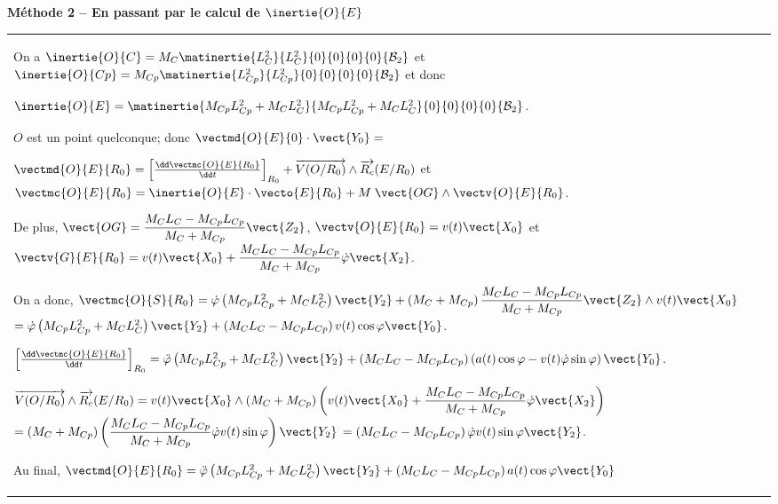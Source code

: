 \begin{multicols}{2}
\begin{corrige}
\textbf{Méthode 2 -- En passant par le calcul de $\inertie{O}{E}$}

 \begin{tabular}{|p{.9\linewidth}}
On a $\inertie{O}{C}=M_C\matinertie{L_C^2}{L_C^2}{0}{0}{0}{0}{\mathcal{B}_2}$ et $\inertie{O}{Cp}=M_{Cp}\matinertie{L_{Cp}^2}{L_{Cp}^2}{0}{0}{0}{0}{\mathcal{B}_2}$ et donc 

$\inertie{O}{E}=\matinertie{M_{Cp}L_{Cp}^2+M_{C}L_{C}^2}{M_{Cp}L_{Cp}^2+M_{C}L_{C}^2}{0}{0}{0}{0}{\mathcal{B}_2}$.

$O$ est un point quelconque; donc $\vectmd{O}{E}{0}\cdot \vect{Y_0} =$

$\vectmd{O}{E}{R_0}=\left[\frac{\dd \vectmc{O}{E}{R_0}}{\dd t}\right]_{R_0}+\overrightarrow{V(O/R_0)}\wedge \overrightarrow{R_c}(E/R_0)$ et 
$\vectmc{O}{E}{R_0}=\inertie{O}{E}\cdot \vecto{E}{R_0}+M\;\vect{OG}\wedge \vectv{O}{E}{R_0}$. 

De plus, 
$\vect{OG}=\dfrac{M_CL_C-M_{Cp}L_{Cp}}{M_C+M_{Cp}}\vect{Z_2}$, $\vectv{O}{E}{R_0}=v(t)\vect{X_0}$ et
$\vectv{G}{E}{R_0}=v(t)\vect{X_0}+\dfrac{M_CL_C-M_{Cp}L_{Cp}}{M_C+M_{Cp}}\dot{\varphi}\vect{X_2}$.


On a donc, 
$\vectmc{O}{S}{R_0}=\dot{\varphi}\left(M_{Cp}L_{Cp}^2+M_{C}L_{C}^2 \right)\vect{Y_2}+\left( M_C+M_{Cp}\right) \dfrac{M_CL_C-M_{Cp}L_{Cp}}{M_C+M_{Cp}}\vect{Z_2}\wedge v(t)\vect{X_0}$
$ = \dot{\varphi}\left(M_{Cp}L_{Cp}^2+M_{C}L_{C}^2 \right)\vect{Y_2}+\left( M_CL_C-M_{Cp}L_{Cp}\right) v(t)\cos\varphi \vect{Y_0}$.

$\left[\frac{\dd \vectmc{O}{E}{R_0}}{\dd t}\right]_{R_0} =\ddot{\varphi}\left(M_{Cp}L_{Cp}^2+M_{C}L_{C}^2 \right)\vect{Y_2}+\left( M_CL_C-M_{Cp}L_{Cp}\right) \left( a(t)\cos\varphi - v(t)\dot{\varphi}\sin\varphi \right)\vect{Y_0}$.

$\overrightarrow{V(O/R_0)}\wedge \overrightarrow{R_c}(E/R_0) =v(t)\vect{X_0} \wedge \left(M_C+M_{Cp}\right) \left( v(t)\vect{X_0}+\dfrac{M_CL_C-M_{Cp}L_{Cp}}{M_C+M_{Cp}}\dot{\varphi}\vect{X_2} \right)$
$=\left(M_C+M_{Cp}\right) \left( \dfrac{M_CL_C-M_{Cp}L_{Cp}}{M_C+M_{Cp}}\dot{\varphi}v(t)\sin\varphi  \right)\vect{Y_2} $
$=\left( M_CL_C-M_{Cp}L_{Cp}  \right)\dot{\varphi}v(t)\sin\varphi\vect{Y_2} $.

Au final, $\vectmd{O}{E}{R_0}=\ddot{\varphi}\left(M_{Cp}L_{Cp}^2+M_{C}L_{C}^2 \right)\vect{Y_2}+\left( M_CL_C-M_{Cp}L_{Cp}\right)  a(t)\cos\varphi \vect{Y_0}$
\\

\end{tabular}


\end{corrige}
\end{multicols}
